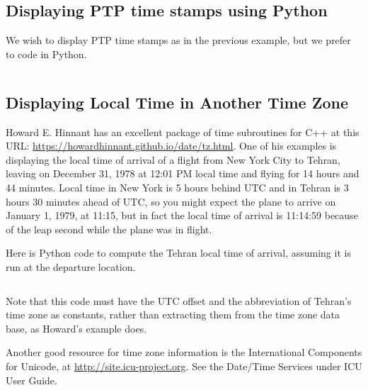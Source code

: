 \documentclass[letterpaper,twoside]{article}
\begin{document}
\inputminted[firstline=41,lastline=74]{c}{examples/example_05.c}

\subsection{Displaying PTP time stamps using Python}
\label{example:PTP_using_Python}
We wish to display PTP time stamps as in the previous example,
but we prefer to code in Python.

\inputminted[firstline=27,lastline=71]{Python}{examples/example_06.py}

\subsection{Displaying Local Time in Another Time Zone}
Howard E. Hinnant has an excellent package of time subroutines
for C++ at this URL:
\href{https://howardhinnant.github.io/date/tz.html}{https://howardhinnant.github.io/date/tz.html}.
One of his examples is displaying the local time of arrival of a flight
from New York City to Tehran, leaving on December 31, 1978 at 12:01 PM
local time and flying for 14 hours and 44 minutes.  Local time in
New York is 5 hours behind UTC and in Tehran is 3 hours 30 minutes
ahead of UTC, so you might expect the plane to arrive on
January 1, 1979, at 11:15, but in fact the local time of arrival
is 11:14:59 because of the leap second while the plane was in flight.

Here is Python code to compute the Tehran local time of arrival,
assuming it is run at the departure location.

\inputminted[firstline=27,lastline=91]{Python}{examples/example_07.py}

Note that this code must have the UTC offset and the abbreviation
of Tehran's time zone as constants, rather than extracting them
from the time zone data base, as Howard's example does.

Another good resource for time zone information is
the International Components for Unicode, at
\href{http://site.icu-project.org}{http://site.icu-project.org}.
See the Date/Time Services under ICU User Guide.
\end{document}
